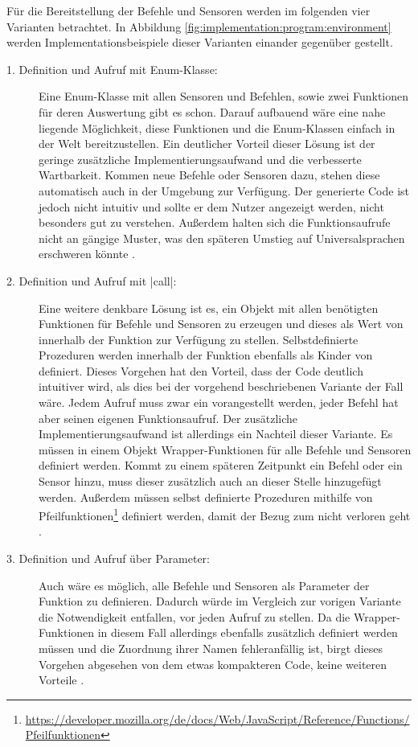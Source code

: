 Für die Bereitstellung der Befehle und Sensoren werden im folgenden vier Varianten betrachtet. In Abbildung \ref{fig:implementation:program:environment} werden Implementationsbeispiele dieser Varianten einander gegenüber gestellt.

\begin{description}
  \item[1. Definition und Aufruf mit Enum-Klasse:] Eine Enum-Klasse mit allen Sensoren und Befehlen, sowie zwei Funktionen für deren Auswertung gibt es schon. Darauf aufbauend wäre eine nahe liegende Möglichkeit, diese Funktionen und die Enum-Klassen einfach in der Welt bereitzustellen. Ein deutlicher Vorteil dieser Lösung ist der geringe zusätzliche Implementierungsaufwand und die verbesserte Wartbarkeit. Kommen neue Befehle oder Sensoren dazu, stehen diese automatisch auch in der Umgebung zur Verfügung. Der generierte Code ist jedoch nicht intuitiv und sollte er dem Nutzer angezeigt werden, nicht besonders gut zu verstehen. Außerdem halten sich die Funktionsaufrufe nicht an gängige Muster, was den späteren Umstieg auf Universalsprachen erschweren könnte .
  \item[2. Definition und Aufruf mit \inlinec|call|:] Eine weitere denkbare Lösung ist es, ein Objekt mit allen benötigten Funktionen für Befehle und Sensoren zu erzeugen und dieses als Wert von  innerhalb der Funktion zur Verfügung zu stellen. Selbstdefinierte Prozeduren werden innerhalb der Funktion ebenfalls als Kinder von  definiert. Dieses Vorgehen hat den Vorteil, dass der Code deutlich intuitiver wird, als dies bei der vorgehend beschriebenen Variante der Fall wäre. Jedem Aufruf muss zwar ein  vorangestellt werden, jeder Befehl hat aber seinen eigenen Funktionsaufruf. Der zusätzliche Implementierungsaufwand ist allerdings ein Nachteil dieser Variante. Es müssen in einem Objekt Wrapper-Funktionen für alle Befehle und Sensoren definiert werden. Kommt zu einem späteren Zeitpunkt ein Befehl oder ein Sensor hinzu, muss dieser zusätzlich auch an dieser Stelle hinzugefügt werden. Außerdem müssen selbst definierte Prozeduren mithilfe von Pfeilfunktionen\footnote{\url{https://developer.mozilla.org/de/docs/Web/JavaScript/Reference/Functions/Pfeilfunktionen}} definiert werden, damit der Bezug zum  nicht verloren geht .
  \item[3. Definition und Aufruf über Parameter:] Auch wäre es möglich, alle Befehle und Sensoren als Parameter der Funktion zu definieren. Dadurch würde im Vergleich zur vorigen Variante die Notwendigkeit entfallen,  vor jeden Aufruf zu stellen. Da die Wrapper-Funktionen in diesem Fall allerdings ebenfalls zusätzlich definiert werden müssen und die Zuordnung ihrer Namen fehleranfällig ist, birgt dieses Vorgehen abgesehen von dem etwas kompakteren Code, keine weiteren Vorteile .

\end{description}
